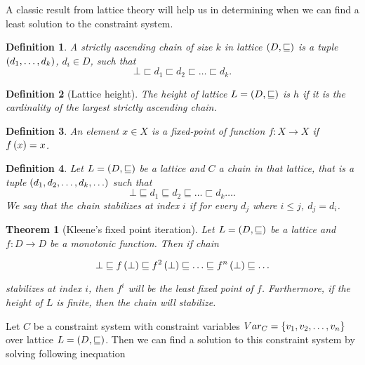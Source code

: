 \documentclass[..thesis.tex]{subfiles}
\newtheorem{defin}{Definition}[section]
\newtheorem{kleene-fix}{Theorem}[section]
\begin{document}
A classic result from lattice theory will help us in determining when we can find a least solution to the constraint system.

\begin{defin}
  A \textit{strictly ascending chain} of size $k$ in lattice $\left( D, \sqsubseteq \right)$ is a tuple $\left( d_1, \ldots, d_k \right)$, $d_i \in D$, such that
  \begin{equation*}
    \bot \sqsubset d_1 \sqsubset d_2 \sqsubset \ldots \sqsubset d_k \text{.}
  \end{equation*}
\end{defin}

\begin{defin}[Lattice height]
  The \textit{height} of lattice $L=\left( D, \sqsubseteq \right)$ is $h$  if it is the cardinality of the largest strictly ascending chain.
\end{defin}

\begin{defin}
  An element $x \in X$ is a  \textit{fixed-point} of function  $f : X \to X$ if $ f \left( x \right) = x$.
\end{defin}

\begin{defin}
  Let $L = \left( D, \sqsubseteq \right)$ be a lattice and $C$ a \textit{chain} in that lattice, that is a tuple $ \left( d_1, d_2, \ldots, d_k, \ldots \right)$ such that
  \begin{equation*}
    \bot \sqsubseteq d_1 \sqsubseteq d_2 \sqsubseteq \ldots \sqsubset d_k \ldots \text{.}
  \end{equation*}
  We say that the chain \textit{stabilizes} at index $i$ if for every $d_j$ where $ i \leq j$, $ d_j = d_i$. 
\end{defin}

\begin{kleene-fix}[Kleene's fixed point iteration]
Let $L = \left( D, \sqsubseteq \right) $ be a lattice and $f : D \to D$ be a monotonic function. Then if chain 

\begin{equation*}
\bot \sqsubseteq f \left( \bot \right) \sqsubseteq f^2 \left( \bot \right) \sqsubseteq \ldots \sqsubseteq f^n \left( \bot \right) \sqsubseteq \ldots
\end{equation*}

stabilizes at index $i$, then $f^{i}$ will be the least fixed point of $f$. Furthermore, if the height of $L$ is finite, then the chain will stabilize.
\end{kleene-fix}

Let $C$ be a constraint system with constraint variables $Var_C= \left\lbrace v_1, v_2, \ldots, v_n \right\rbrace$ over lattice $L = \left( D, \sqsubseteq \right)$. Then we can find a solution to this constraint system by solving following inequation
\end{document}
